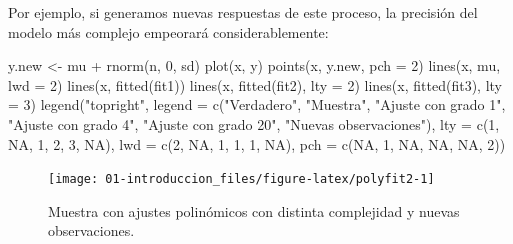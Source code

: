 \documentclass[
  spanish,
]{book}
\newenvironment{Shaded}{\begin{snugshade}}{\end{snugshade}}
\newcommand{\AttributeTok}[1]{\textcolor[rgb]{0.77,0.63,0.00}{#1}}
\newcommand{\ConstantTok}[1]{\textcolor[rgb]{0.00,0.00,0.00}{#1}}
\newcommand{\DecValTok}[1]{\textcolor[rgb]{0.00,0.00,0.81}{#1}}
\newcommand{\FunctionTok}[1]{\textcolor[rgb]{0.00,0.00,0.00}{#1}}
\newcommand{\NormalTok}[1]{#1}
\newcommand{\OtherTok}[1]{\textcolor[rgb]{0.56,0.35,0.01}{#1}}
\newcommand{\SpecialCharTok}[1]{\textcolor[rgb]{0.00,0.00,0.00}{#1}}
\newcommand{\StringTok}[1]{\textcolor[rgb]{0.31,0.60,0.02}{#1}}
\theoremstyle{break}
\theoremstyle{definition}
\theoremstyle{definition}
\theoremstyle{definition}
\theoremstyle{definition}
\theoremstyle{remark}
\begin{document}
Por ejemplo, si generamos nuevas respuestas de este proceso, la precisión del modelo más complejo empeorará considerablemente:

\begin{Shaded}
\begin{Highlighting}[]
\NormalTok{y.new }\OtherTok{\textless{}{-}}\NormalTok{ mu }\SpecialCharTok{+} \FunctionTok{rnorm}\NormalTok{(n, }\DecValTok{0}\NormalTok{, sd)}
\FunctionTok{plot}\NormalTok{(x, y) }
\FunctionTok{points}\NormalTok{(x, y.new, }\AttributeTok{pch =} \DecValTok{2}\NormalTok{)}
\FunctionTok{lines}\NormalTok{(x, mu, }\AttributeTok{lwd =} \DecValTok{2}\NormalTok{)}
\FunctionTok{lines}\NormalTok{(x, }\FunctionTok{fitted}\NormalTok{(fit1))}
\FunctionTok{lines}\NormalTok{(x, }\FunctionTok{fitted}\NormalTok{(fit2), }\AttributeTok{lty =} \DecValTok{2}\NormalTok{)}
\FunctionTok{lines}\NormalTok{(x, }\FunctionTok{fitted}\NormalTok{(fit3), }\AttributeTok{lty =} \DecValTok{3}\NormalTok{)}
\FunctionTok{legend}\NormalTok{(}\StringTok{"topright"}\NormalTok{, }\AttributeTok{legend =} \FunctionTok{c}\NormalTok{(}\StringTok{"Verdadero"}\NormalTok{, }\StringTok{"Muestra"}\NormalTok{, }\StringTok{"Ajuste con grado 1"}\NormalTok{, }\StringTok{"Ajuste con grado 4"}\NormalTok{, }
                              \StringTok{"Ajuste con grado 20"}\NormalTok{, }\StringTok{"Nuevas observaciones"}\NormalTok{), }
       \AttributeTok{lty =} \FunctionTok{c}\NormalTok{(}\DecValTok{1}\NormalTok{, }\ConstantTok{NA}\NormalTok{, }\DecValTok{1}\NormalTok{, }\DecValTok{2}\NormalTok{, }\DecValTok{3}\NormalTok{, }\ConstantTok{NA}\NormalTok{), }\AttributeTok{lwd =} \FunctionTok{c}\NormalTok{(}\DecValTok{2}\NormalTok{, }\ConstantTok{NA}\NormalTok{, }\DecValTok{1}\NormalTok{, }\DecValTok{1}\NormalTok{, }\DecValTok{1}\NormalTok{, }\ConstantTok{NA}\NormalTok{), }\AttributeTok{pch =} \FunctionTok{c}\NormalTok{(}\ConstantTok{NA}\NormalTok{, }\DecValTok{1}\NormalTok{, }\ConstantTok{NA}\NormalTok{, }\ConstantTok{NA}\NormalTok{, }\ConstantTok{NA}\NormalTok{, }\DecValTok{2}\NormalTok{))}
\end{Highlighting}
\end{Shaded}

\begin{figure}[!htb]

{\centering \texttt{[image: 01-introduccion\_files/figure-latex/polyfit2-1]} 

}

\caption{Muestra con ajustes polinómicos con distinta complejidad y nuevas observaciones.}\label{fig:polyfit2}
\end{figure}
\end{document}
